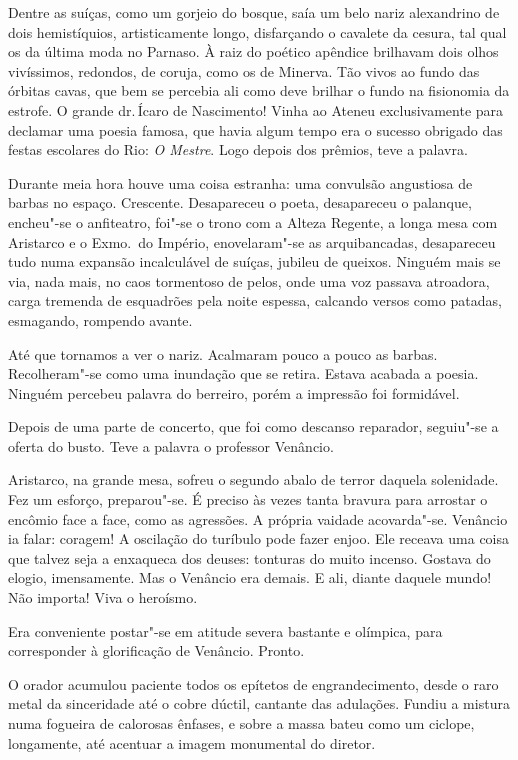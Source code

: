 Dentre as suíças, como um gorjeio do bosque, saía um belo nariz
alexandrino de dois hemistíquios, artisticamente longo, disfarçando o
cavalete da cesura, tal qual os da última moda no Parnaso. À raiz do
poético apêndice brilhavam dois olhos vivíssimos, redondos, de coruja,
como os de Minerva. Tão vivos ao fundo das órbitas cavas, que bem se
percebia ali como deve brilhar o fundo na fisionomia da estrofe. O
grande dr.\,Ícaro de Nascimento! Vinha ao Ateneu exclusivamente para
declamar uma poesia famosa, que havia algum tempo era o sucesso
obrigado das festas escolares do Rio: \textit{O Mestre}. Logo depois dos
prêmios, teve a palavra.

Durante meia hora houve uma coisa estranha: uma convulsão angustiosa de
barbas no espaço. Crescente. Desapareceu o poeta, desapareceu o
palanque, encheu"-se o anfiteatro, foi"-se o trono com a Alteza
Regente, a longa mesa com Aristarco e o Exmo.~do Império,
enovelaram"-se as arquibancadas, desapareceu tudo numa expansão
incalculável de suíças, jubileu de queixos. Ninguém mais se via, nada
mais, no caos tormentoso de pelos, onde uma voz passava atroadora,
carga tremenda de esquadrões pela noite espessa, calcando versos como
patadas, esmagando, rompendo avante. 


Até que tornamos a ver o nariz.
Acalmaram pouco a pouco as barbas. Recolheram"-se como uma inundação
que se retira. Estava acabada a poesia. Ninguém percebeu palavra do
berreiro, porém a impressão foi formidável. 

Depois de uma parte de
concerto, que foi como descanso reparador, seguiu"-se a oferta do
busto. Teve a palavra o professor Venâncio. 

Aristarco, na grande mesa,
sofreu o segundo abalo de terror daquela solenidade. Fez um esforço,
preparou"-se. É preciso às vezes tanta bravura para arrostar o encômio
face a face, como as agressões. A própria vaidade acovarda"-se.
Venâncio ia falar: coragem! A oscilação do turíbulo pode fazer enjoo.
Ele receava uma coisa que talvez seja a enxaqueca dos deuses: tonturas
do muito incenso. Gostava do elogio, imensamente. Mas o Venâncio era
demais. E ali, diante daquele mundo! Não importa! Viva o heroísmo. 

Era conveniente postar"-se em atitude severa bastante e olímpica, para
corresponder à glorificação de Venâncio. Pronto. 

O orador acumulou
paciente todos os epítetos de engrandecimento, desde o raro metal da
sinceridade até o cobre dúctil, cantante das adulações. Fundiu a
mistura numa fogueira de calorosas ênfases, e sobre a massa bateu como
um ciclope, longamente, até acentuar a imagem monumental do diretor.


